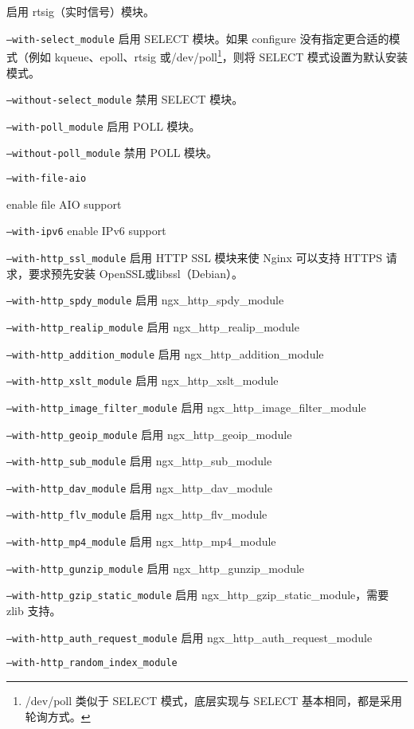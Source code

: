 \begin{compactitem}
启用 rtsig（实时信号）模块。
\item \texttt{--with-select\_module}
启用 SELECT 模块。如果 configure 没有指定更合适的模式（例如 kqueue、epoll、rtsig 或/dev/poll\footnote{/dev/poll 类似于 SELECT 模式，底层实现与 SELECT 基本相同，都是采用轮询方式。}，则将 SELECT 模式设置为默认安装模式。
\item \texttt{--without-select\_module}
禁用 SELECT 模块。
\item \texttt{--with-poll\_module}
启用 POLL 模块。
\item \texttt{--without-poll\_module}
禁用 POLL 模块。
\item \texttt{--with-file-aio}

enable file AIO support
\item \texttt{--with-ipv6}
enable IPv6 support
\item \texttt{--with-http\_ssl\_module}
启用 HTTP SSL 模块来使 Nginx 可以支持 HTTPS 请求，要求预先安装 OpenSSL或libssl（Debian）。
\item \texttt{--with-http\_spdy\_module}
启用 ngx\_http\_spdy\_module
\item \texttt{--with-http\_realip\_module}
启用 ngx\_http\_realip\_module
\item \texttt{--with-http\_addition\_module}
启用 ngx\_http\_addition\_module
\item \texttt{--with-http\_xslt\_module}
启用 ngx\_http\_xslt\_module
\item \texttt{--with-http\_image\_filter\_module}
启用 ngx\_http\_image\_filter\_module
\item \texttt{--with-http\_geoip\_module}
启用 ngx\_http\_geoip\_module
\item \texttt{--with-http\_sub\_module}
启用 ngx\_http\_sub\_module
\item \texttt{--with-http\_dav\_module}
启用 ngx\_http\_dav\_module
\item \texttt{--with-http\_flv\_module}
启用 ngx\_http\_flv\_module
\item \texttt{--with-http\_mp4\_module}
启用 ngx\_http\_mp4\_module
\item \texttt{--with-http\_gunzip\_module}
启用 ngx\_http\_gunzip\_module
\item \texttt{--with-http\_gzip\_static\_module}
启用 ngx\_http\_gzip\_static\_module，需要 zlib 支持。
\item \texttt{--with-http\_auth\_request\_module}
启用 ngx\_http\_auth\_request\_module
\item \texttt{--with-http\_random\_index\_module}

\end{compactitem}
